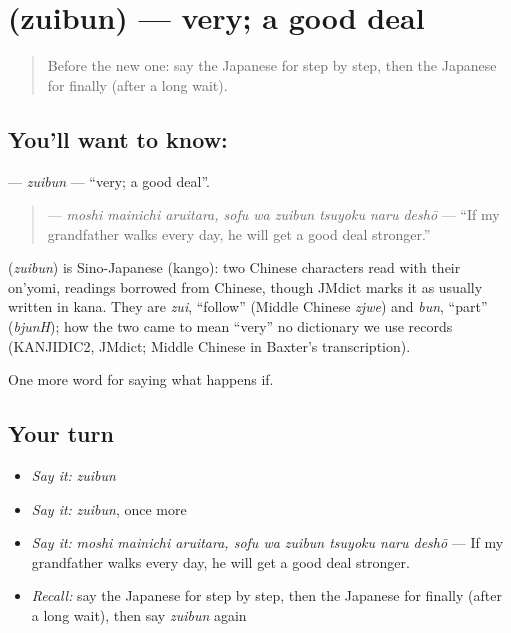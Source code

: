 \section[\texorpdfstring{\ja{ずいぶん} (zuibun)}{ずいぶん (zuibun)}]{ (zuibun) — very; a good deal}

\label{lesson:JA-C521-zuibun}



\begin{quote}
Before the new one: say the Japanese for step by step, then the Japanese for finally (after a long wait).
\end{quote}

\subsection*{You'll want to know: }
\textbf{} — \emph{zuibun} — \textquotedblleft{}very; a good deal\textquotedblright{}.

\begin{quote}
\textbf{     } — \emph{moshi mainichi aruitara, sofu wa zuibun tsuyoku naru deshō} — \textquotedblleft{}If my grandfather walks every day, he will get a good deal stronger.\textquotedblright{}
\end{quote}

\begin{cousinweb}
\textbf{} (\emph{zuibun}) is Sino-Japanese (kango): two Chinese characters read with their on'yomi, readings borrowed from Chinese, though JMdict marks it as usually written in kana. They are \emph{zui}, \textquotedblleft{}follow\textquotedblright{} (Middle Chinese \emph{zjwe}) and \emph{bun}, \textquotedblleft{}part\textquotedblright{} (\emph{bjunH}); how the two came to mean \textquotedblleft{}very\textquotedblright{} no dictionary we use records (KANJIDIC2, JMdict; Middle Chinese in Baxter's transcription).
\end{cousinweb}

\begin{grammarlens}[title={What you've built}]
One more word for saying what happens if.
\end{grammarlens}

\subsection*{Your turn}
\begin{itemize}
\raggedright
  \item \emph{Say it:} \emph{zuibun}
  \item \emph{Say it:} \emph{zuibun}, once more
  \item \emph{Say it:} \emph{moshi mainichi aruitara, sofu wa zuibun tsuyoku naru deshō} — If my grandfather walks every day, he will get a good deal stronger.
  \item \emph{Recall:} say the Japanese for step by step, then the Japanese for finally (after a long wait), then say \emph{zuibun} again
\end{itemize}

